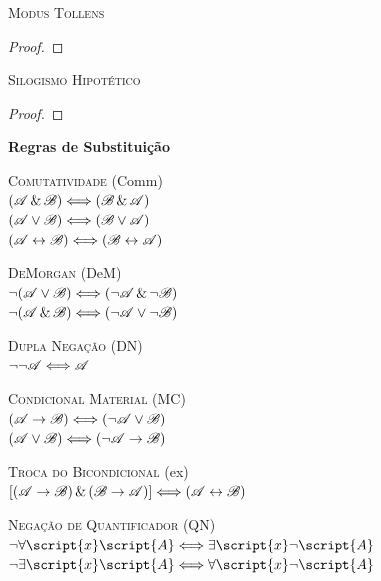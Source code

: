 \textsc{Modus Tollens}

\begin{proof}
	 
\end{proof}

\textsc{Silogismo Hipotético}

\begin{proof}
\end{proof}



{\LARGE \bf Regras de Substituição}
{
\center

\textsc{Comutatividade} (Comm)\\
$(\mathscr{A}\,\&\,\mathscr{B}) \Longleftrightarrow (\mathscr{B}\,\&\,\mathscr{A})$\\
$(\mathscr{A}\vee\mathscr{B}) \Longleftrightarrow (\mathscr{B}\vee\mathscr{A})$\\
$(\mathscr{A}\leftrightarrow\mathscr{B}) \Longleftrightarrow (\mathscr{B}\leftrightarrow\mathscr{A})$

\textsc{DeMorgan} (DeM)\\
$\neg(\mathscr{A}\vee\mathscr{B}) \Longleftrightarrow (\neg\mathscr{A}\,\&\,\neg\mathscr{B})$\\
$\neg(\mathscr{A}\,\&\,\mathscr{B}) \Longleftrightarrow (\neg\mathscr{A}\vee\neg\mathscr{B})$

\textsc{Dupla Negação} (DN)\\
$\neg\neg\mathscr{A} \Longleftrightarrow \mathscr{A}$

\textsc{Condicional Material} (MC)\\
$(\mathscr{A}\rightarrow\mathscr{B}) \Longleftrightarrow (\neg\mathscr{A}\vee\mathscr{B})$\\
$(\mathscr{A}\vee\mathscr{B}) \Longleftrightarrow (\neg\mathscr{A}\rightarrow\mathscr{B})$

\textsc{Troca do Bicondicional} ({\eiff}{ex})\\
$[(\mathscr{A}\rightarrow\mathscr{B})\,\&\,(\mathscr{B}\rightarrow\mathscr{A})] \Longleftrightarrow (\mathscr{A}\leftrightarrow\mathscr{B})$

\textsc{Negação de Quantificador} (QN)\\
$\enot\forall\script{x}\script{A} \Longleftrightarrow \exists\script{x}\enot\script{A}$\\
$\enot\exists\script{x}\script{A} \Longleftrightarrow \forall\script{x}\enot\script{A}$

}
